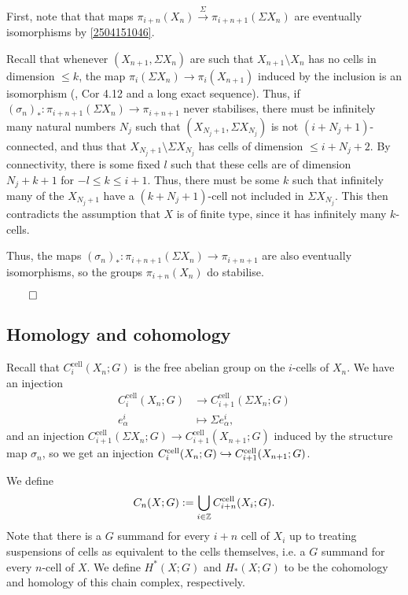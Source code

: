 \documentclass{MetricNotes2023}
\def\inj{\ensuremath\hookrightarrow}
\def\inte{\ensuremath\mathbb{Z}}
\def\done{\begin{flushright}\vspace{-4.35ex}\(\qed\)\end{flushright}}
\begin{document}
\begin{ourproof}
First, note that that maps \(\pi_{i+n}(X_n) \xrightarrow{\Sigma} \pi_{i+n+1}(\Sigma X_n)\) are eventually isomorphisms by \ref{2504151046}. 

Recall that whenever \((X_{n+1}, \Sigma X_n)\) are such that \(X_{n+1}\setminus X_n\) has no cells in dimension \(\leq k\), the map \(\pi_i(\Sigma X_n)\to \pi_i(X_{n+1})\) induced by the inclusion is an isomorphism (\autocite{hatcher}, Cor 4.12 and a long exact sequence). Thus, if \((\sigma_n)_* : \pi_{i+n+1}(\Sigma X_n)\to \pi_{i+n+1}\) never stabilises, there must be infinitely many natural numbers \(N_j\) such that \((X_{N_j+1}, \Sigma X_{N_j})\) is not \((i+N_j+1)\)-connected, and thus that \(X_{N_j+1}\setminus \Sigma X_{N_j}\) has cells of dimension \(\leq i+N_j+2\). By connectivity, there is some fixed \(l\) such that these cells are of dimension \(N_j+k+1\) for \(-l\leq k \leq i+1\). Thus, there must be some \(k\) such that infinitely many of the \(X_{N_j+1}\) have a \((k+N_j+1)\)-cell not included in \(\Sigma X_{N_j}\). This then contradicts the assumption that \(X\) is of finite type, since it has infinitely many \(k\)-cells. 

Thus, the maps \((\sigma_n)_* : \pi_{i+n+1}(\Sigma X_n)\to \pi_{i+n+1}\) are also eventually isomorphisms, so the groups \(\pi_{i+n}(X_n)\) do stabilise.\done
\end{ourproof}

\subsection{Homology and cohomology}


Recall that \(C^\text{cell}_i(X_n; G)\) is the free abelian group on the \(i\)-cells of \(X_n\). We have an injection
\begin{align*}
C_i^\text{cell}(X_n;G) &\to C_{i+1}^\text{cell}(\Sigma X_n; G)\\
e^i_\alpha &\mapsto \Sigma e^i_\alpha,
\end{align*}
and an injection \(C^\text{cell}_{i+1}(\Sigma X_n; G)\to C^\text{cell}_{i+1}(X_{n+1}; G)\) induced by the structure map \(\sigma_n\), so we get an injection \(C^\text{cell}_i(X_n;G)\inj C^\text{cell}_{i+1}(X_{n+1};G)\).

We define
\[C_n(X ; G):=\bigcup_{i\in \inte}C^\text{cell}_{i+n}(X_i; G).\] 
Note that there is a \(G\) summand for every \(i+n\) cell of \(X_i\) up to treating suspensions of cells as equivalent to the cells themselves, i.e. a \(G\) summand for every \(n\)-cell of \(X\). We define \(H^*(X;G)\) and \(H_*(X;G)\) to be the cohomology and homology of this chain complex, respectively.
\end{document}
